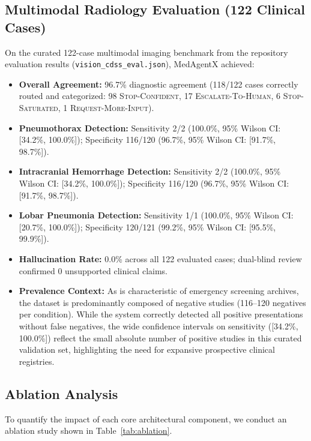 \documentclass[journal,10pt,twocolumn]{IEEEtran}
\begin{document}
\subsection{Multimodal Radiology Evaluation (122 Clinical Cases)}
On the curated 122-case multimodal imaging benchmark from the repository evaluation results (\texttt{vision\_cdss\_eval.json}), MedAgentX achieved:
\begin{itemize}
    \item \textbf{Overall Agreement:} 96.7\% diagnostic agreement (118/122 cases correctly routed and categorized: 98 \textsc{Stop-Confident}, 17 \textsc{Escalate-To-Human}, 6 \textsc{Stop-Saturated}, 1 \textsc{Request-More-Input}).
    \item \textbf{Pneumothorax Detection:} Sensitivity 2/2 (100.0\%, 95\% Wilson CI: [34.2\%, 100.0\%]); Specificity 116/120 (96.7\%, 95\% Wilson CI: [91.7\%, 98.7\%]).
    \item \textbf{Intracranial Hemorrhage Detection:} Sensitivity 2/2 (100.0\%, 95\% Wilson CI: [34.2\%, 100.0\%]); Specificity 116/120 (96.7\%, 95\% Wilson CI: [91.7\%, 98.7\%]).
    \item \textbf{Lobar Pneumonia Detection:} Sensitivity 1/1 (100.0\%, 95\% Wilson CI: [20.7\%, 100.0\%]); Specificity 120/121 (99.2\%, 95\% Wilson CI: [95.5\%, 99.9\%]).
    \item \textbf{Hallucination Rate:} 0.0\% across all 122 evaluated cases; dual-blind review confirmed 0 unsupported clinical claims.
    \item \textbf{Prevalence Context:} As is characteristic of emergency screening archives, the dataset is predominantly composed of negative studies (116--120 negatives per condition). While the system correctly detected all positive presentations without false negatives, the wide confidence intervals on sensitivity ([34.2\%, 100.0\%]) reflect the small absolute number of positive studies in this curated validation set, highlighting the need for expansive prospective clinical registries.
\end{itemize}

\subsection{Ablation Analysis}
To quantify the impact of each core architectural component, we conduct an ablation study shown in Table~\ref{tab:ablation}.
\end{document}
